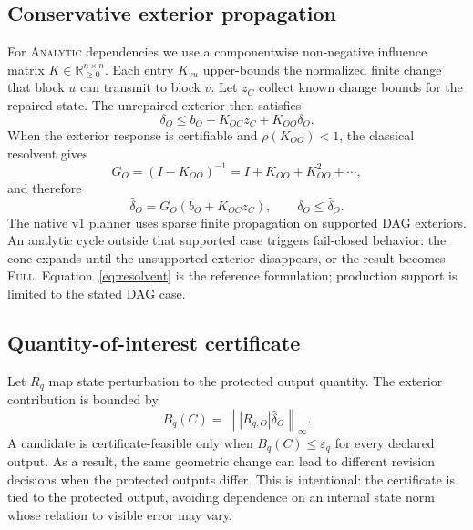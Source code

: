 \documentclass[acmtog,nonacm]{acmart}
\newcommand{\FULL}{\textsc{Full}}
\newcommand{\analytic}{\textsc{Analytic}}
\begin{document}
\subsection{Conservative exterior propagation}
For \analytic{} dependencies we use a componentwise non-negative influence matrix $K\in\mathbb{R}_{\ge0}^{n\times n}$. Each entry $K_{vu}$ upper-bounds the normalized finite change that block $u$ can transmit to block $v$. Let $z_C$ collect known change bounds for the repaired state. The unrepaired exterior then satisfies
\begin{equation}
\delta_O \le b_O + K_{OC}z_C + K_{OO}\delta_O.
\label{eq:exterior}
\end{equation}
When the exterior response is certifiable and $\rho(K_{OO})<1$, the classical resolvent gives
\begin{equation}
G_O=(I-K_{OO})^{-1}=I+K_{OO}+K_{OO}^2+\cdots,
\end{equation}
and therefore
\begin{equation}
\hat{\delta}_O = G_O\left(b_O+K_{OC}z_C\right),\qquad
\delta_O\le\hat{\delta}_O.
\label{eq:resolvent}
\end{equation}
The native v1 planner uses sparse finite propagation on supported DAG exteriors. An analytic cycle outside that supported case triggers fail-closed behavior: the cone expands until the unsupported exterior disappears, or the result becomes \FULL{}. Equation~\ref{eq:resolvent} is the reference formulation; production support is limited to the stated DAG case.

\subsection{Quantity-of-interest certificate}
Let $R_q$ map state perturbation to the protected output quantity. The exterior contribution is bounded by
\begin{equation}
B_q(C)=\left\lVert |R_{q,O}|\hat{\delta}_O\right\rVert_\infty.
\label{eq:qoi}
\end{equation}
A candidate is certificate-feasible only when $B_q(C)\le\varepsilon_q$ for every declared output. As a result, the same geometric change can lead to different revision decisions when the protected outputs differ. This is intentional: the certificate is tied to the protected output, avoiding dependence on an internal state norm whose relation to visible error may vary.
\end{document}

